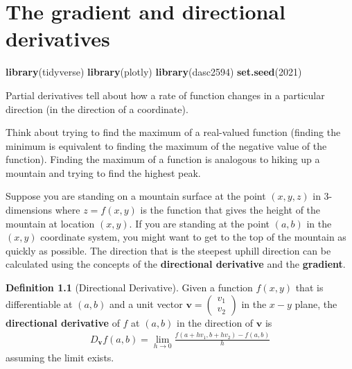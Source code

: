 \documentclass[
]{book}
\newenvironment{Shaded}{\begin{snugshade}}{\end{snugshade}}
\newcommand{\DecValTok}[1]{\textcolor[rgb]{0.00,0.00,0.81}{#1}}
\newcommand{\KeywordTok}[1]{\textcolor[rgb]{0.13,0.29,0.53}{\textbf{#1}}}
\newcommand{\NormalTok}[1]{#1}
\theoremstyle{definition}
\newtheorem{definition}{Definition}[chapter]
\theoremstyle{definition}
\theoremstyle{definition}
\theoremstyle{definition}
\theoremstyle{remark}
\begin{document}
\hypertarget{the-gradient-and-directional-derivatives}{%
\chapter{The gradient and directional derivatives}\label{the-gradient-and-directional-derivatives}}

\begin{Shaded}
\begin{Highlighting}[]
\KeywordTok{library}\NormalTok{(tidyverse)}
\KeywordTok{library}\NormalTok{(plotly)}
\KeywordTok{library}\NormalTok{(dasc2594)}
\KeywordTok{set.seed}\NormalTok{(}\DecValTok{2021}\NormalTok{)}
\end{Highlighting}
\end{Shaded}

Partial derivatives tell about how a rate of function changes in a particular direction (in the direction of a coordinate).

Think about trying to find the maximum of a real-valued function (finding the minimum is equivalent to finding the maximum of the negative value of the function). Finding the maximum of a function is analogous to hiking up a mountain and trying to find the highest peak.

Suppose you are standing on a mountain surface at the point \((x, y, z)\) in 3-dimensions where \(z = f(x, y)\) is the function that gives the height of the mountain at location \((x, y)\). If you are standing at the point \((a, b)\) in the \((x, y)\) coordinate system, you might want to get to the top of the mountain as quickly as possible. The direction that is the steepest uphill direction can be calculated using the concepts of the \textbf{directional derivative} and the \textbf{gradient}.

\begin{definition}[Directional Derivative]
Given a function \(f(x,y)\) that is differentiable at \((a, b)\) and a unit vector \(\mathbf{v} = \begin{pmatrix} v_1 \\ v_2 \end{pmatrix}\) in the \(x-y\) plane, the \textbf{directional derivative} of \(f\) at \((a, b)\) in the direction of \(\mathbf{v}\) is
\[
\begin{aligned}
D_{\mathbf{v}} f(a, b) = \lim_{h \rightarrow 0} \frac{f(a + h v_1, b + h v_2) - f(a, b)}{h}
\end{aligned}
\]
assuming the limit exists.
\end{definition}
\end{document}
